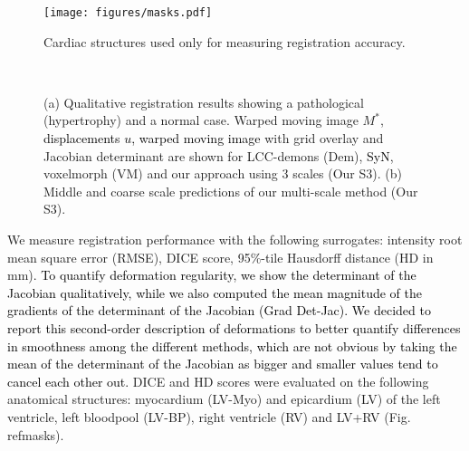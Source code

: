 \documentclass[journal]{IEEEtran}
\newcommand{\update}[1]{\textcolor{black}{#1}}
\begin{document}
\begin{wrapfigure}[11]{r}{0.37\columnwidth}
\centering 
\vspace{-6pt}
\texttt{[image: figures/masks.pdf]}
\vspace{-17pt}
\caption{\small{Cardiac structures used only for measuring registration accuracy.}}\label{masks}
\end{wrapfigure} 


\begin{figure*}[tb]
\centering 
{} \\
\caption{\small{(a) Qualitative registration results showing a pathological (hypertrophy) and a normal case. Warped moving image $M^*$, \update{displacements $u$, warped moving image }with grid overlay and Jacobian determinant are shown for LCC-demons (Dem), \update{SyN}, voxelmorph (VM) and our approach using 3 scales (Our S3). (b) Middle and coarse scale predictions of our multi-scale method (Our S3).}}
\end{figure*}

We measure registration performance with the following surrogates: intensity root mean square error (RMSE), DICE score, 95\%-tile Hausdorff distance (HD in mm)\update{. To quantify deformation regularity, we show the determinant of the Jacobian qualitatively, while we also computed the mean magnitude of the gradients of the determinant of the Jacobian (Grad Det-Jac). We decided to report this second-order description of deformations to better quantify differences in smoothness among the different methods, which are not obvious by taking the mean of the determinant of the Jacobian as bigger and smaller values tend to cancel each other out.} DICE and HD scores were evaluated on the following anatomical structures: myocardium (LV-Myo) and epicardium (LV) of the left ventricle, left bloodpool (LV-BP), right ventricle (RV) and LV+RV (Fig.\\ref{masks}).
\end{document}
